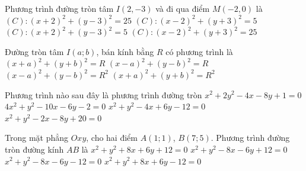 

\begin{ex}%
	Phương trình  đường tròn tâm $I(2,-3)$ và đi qua điểm $M(-2,0)$ là
	\choice 
		{$(C):(x+2)^2+(y-3)^2=25$} 
		{$(C):(x-2)^2+(y+3)^2=5$} 
		 {$(C):(x+2)^2+(y-3)^2=5$}
		 {\True $(C):(x-2)^2+(y+3)^2=25$}
\end{ex}

\begin{ex}%
	Đường tròn tâm $I(a;b)$, bán kính bằng  $R$ có phương trình là
	 \choice
		 {$(x+a)^2+(y+b)^2=R$}
		{$(x-a)^2+(y-b)^2=R$} 
		{\True $(x-a)^2+(y-b)^2=R^2$} 
		{$(x+a)^2+(y+b)^2=R^2$} 
\end{ex}

\begin{ex}%
	Phương  trình nào sau đây là phương trình đường tròn
	\choice 
		 {$x^{2}+2y^{2}-4x-8y+1=0$}
		 {$4x^{2}+y^{2}-10x-6y-2=0$}
		{\True  $x^{2}+y^{2}-4x+6y-12=0$}
		 {$x^{2}+y^{2}-2x-8y+20=0$}
\end{ex}

\begin{ex}%
	Trong mặt phẳng $Oxy$, cho hai điểm $A(1;1)$, $B(7;5)$. Phương trình đường tròn đường  kính $AB$ là
	\choice 
		 {$x^2+y^2+8x+6y+12=0$}
		 {\True $x^2+y^2-8x-6y+12=0$}
		 {$x^2+y^2-8x-6y-12=0$}
		 {$x^2+y^2+8x+6y-12=0$}
\end{ex}


